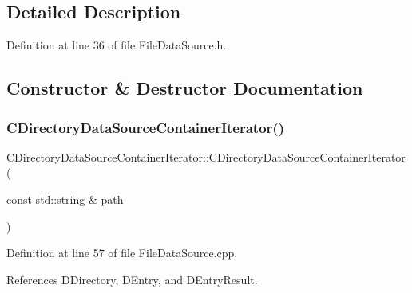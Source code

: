 \subsection{Detailed Description}


Definition at line 36 of file File\+Data\+Source.\+h.



\subsection{Constructor \& Destructor Documentation}
\hypertarget{classCDirectoryDataSourceContainerIterator_a34b3253df5cc88a08b8f3f51f7fe9768}{}\label{classCDirectoryDataSourceContainerIterator_a34b3253df5cc88a08b8f3f51f7fe9768} 
\subsubsection{\texorpdfstring{C\+Directory\+Data\+Source\+Container\+Iterator()}{CDirectoryDataSourceContainerIterator()}}
{\footnotesize\ttfamily C\+Directory\+Data\+Source\+Container\+Iterator\+::\+C\+Directory\+Data\+Source\+Container\+Iterator (\begin{DoxyParamCaption}\item[{const std\+::string \&}]{path }\end{DoxyParamCaption})\hspace{0.3cm}{\ttfamily [protected]}}



Definition at line 57 of file File\+Data\+Source.\+cpp.



References D\+Directory, D\+Entry, and D\+Entry\+Result.


